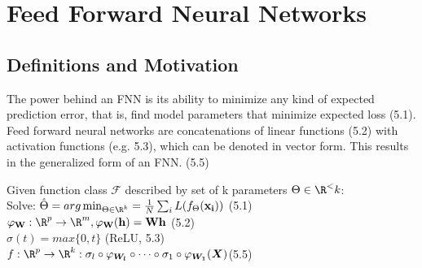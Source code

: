 \documentclass[english]{latex4ei/latex4ei_sheet}
\begin{document}

\newpage

\section{Feed Forward Neural Networks}
\begin{sectionbox}
\subsection{Definitions and Motivation}
The power behind an FNN is its ability to minimize any kind of expected prediction error, that is, find model parameters that minimize expected loss (5.1). Feed forward neural networks are concatenations of linear functions (5.2) with activation functions (e.g. 5.3), which can be denoted in vector form. This results in the generalized form of an FNN. (5.5)
\begin{emphbox}
    Given function class $\mathcal{F}$ described by set of k parameters $\Theta\in\R^<k$:\\
    Solve: $\hat{\Theta}=arg\min_{\Theta\in\R^k}=\frac{1}{N}\sum_iL(f_\Theta(\mathbf{x_i}))$ (5.1)\\
    $\varphi_\mathbf{W}:\R^p\rightarrow\R^m, \varphi_\mathbf{W}(\mathbf{h})=\mathbf{Wh}$ (5.2)\\
    $\sigma(t)=max\{0,t\}$ (ReLU, 5.3)\\
    $f:\R^p \rightarrow \R^k: \sigma_l\circ\varphi_{\boldsymbol{W_l}}\circ\cdots\circ\sigma_1\circ\varphi_{\boldsymbol{W_1}}(\boldsymbol{X})$(5.5)
\end{emphbox}

\end{sectionbox}
\end{document}
